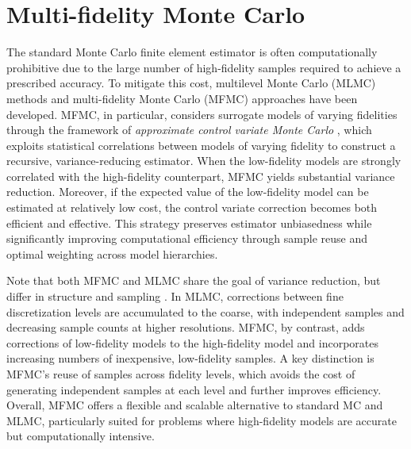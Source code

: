 \section{Multi-fidelity Monte Carlo}\label{sec:MFMC}
%
The standard Monte Carlo finite element estimator is often computationally prohibitive due to the large number of high-fidelity samples required to achieve a prescribed accuracy. To mitigate this cost, multilevel Monte Carlo (MLMC) methods \cite{Gi:2008,Gi:2015} and multi-fidelity Monte Carlo (MFMC) approaches \cite{PeWiGu:2016} have been developed. MFMC,  in particular, considers surrogate models of varying fidelities through the framework of {\it approximate control variate Monte Carlo} \cite{GoGeElJa:2020}, which exploits statistical 
correlations between models of varying fidelity to construct a recursive, variance-reducing estimator. When the low-fidelity models are strongly correlated with the high-fidelity counterpart, MFMC yields substantial variance reduction. Moreover, if the expected value of the low-fidelity model can be estimated at relatively low cost, the control variate correction becomes both efficient and effective. This strategy preserves estimator unbiasedness while significantly improving computational efficiency through sample reuse and optimal weighting across model hierarchies. 



Note that both MFMC and MLMC share the goal of variance reduction, but differ in structure and sampling \cite{ArGuMoWi:2025,PeGuWi:2018}. In MLMC, corrections between fine discretization levels are accumulated to the coarse, with independent samples and decreasing sample counts at higher resolutions. MFMC, by contrast, adds corrections of low-fidelity models to the high-fidelity model and incorporates increasing numbers of inexpensive, low-fidelity samples. A key distinction is MFMC’s reuse of samples across fidelity levels, which avoids the cost of generating independent samples at each level and further improves efficiency. Overall, MFMC offers a flexible and scalable alternative to standard MC and MLMC, particularly suited for problems where high-fidelity models are accurate but computationally intensive.


